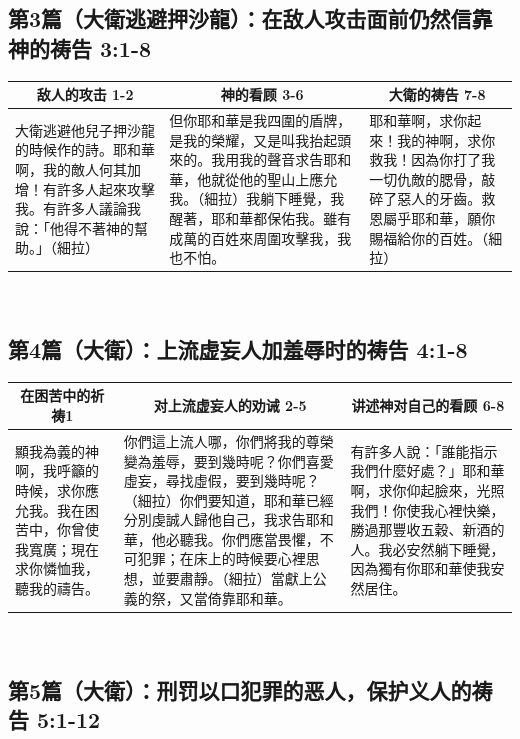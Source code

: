 \subsection{第3篇（大衛逃避押沙龍）：在敌人攻击面前仍然信靠神的祷告 3:1-8}
\begin{table}[H]
\centering
\begin{tabular}{p{}|p{6.500cm}|p{5.2500cm}}\hline\hline
\multicolumn{1}{c|}{敌人的攻击 1-2}&\multicolumn{1}{c|}{神的看顾 3-6}&\multicolumn{1}{c}{大衛的祷告 7-8}\\\hline
大衛逃避他兒子押沙龍的時候作的詩。耶和華啊，我的敵人何其加增！有許多人起來攻擊我。有許多人議論我說：「他得不著神的幫助。」（細拉）
&但你耶和華是我四圍的盾牌，是我的榮耀，又是叫我抬起頭來的。我用我的聲音求告耶和華，他就從他的聖山上應允我。（細拉）我躺下睡覺，我醒著，耶和華都保佑我。雖有成萬的百姓來周圍攻擊我，我也不怕。
&耶和華啊，求你起來！我的神啊，求你救我！因為你打了我一切仇敵的腮骨，敲碎了惡人的牙齒。救恩屬乎耶和華，願你賜福給你的百姓。（細拉）\\\hline
\end{tabular}
\end{table} 


\subsection{第4篇（大衛）：上流虚妄人加羞辱时的祷告  4:1-8}
\begin{table}[H]
\centering
\begin{tabular}{p{}|p{8.500cm}|p{5.2500cm}}\hline\hline
\multicolumn{1}{c|}{在困苦中的祈祷1}&\multicolumn{1}{c|}{对上流虚妄人的劝诫  2-5}&\multicolumn{1}{c}{讲述神对自己的看顾  6-8}\\\hline
顯我為義的神啊，我呼籲的時候，求你應允我。我在困苦中，你曾使我寬廣；現在求你憐恤我，聽我的禱告。
&你們這上流人哪，你們將我的尊榮變為羞辱，要到幾時呢？你們喜愛虛妄，尋找虛假，要到幾時呢？（細拉）你們要知道，耶和華已經分別虔誠人歸他自己，我求告耶和華，他必聽我。你們應當畏懼，不可犯罪；在床上的時候要心裡思想，並要肅靜。（細拉）當獻上公義的祭，又當倚靠耶和華。
&有許多人說：「誰能指示我們什麼好處？」耶和華啊，求你仰起臉來，光照我們！你使我心裡快樂，勝過那豐收五穀、新酒的人。我必安然躺下睡覺，因為獨有你耶和華使我安然居住。\\\hline
\end{tabular}
\end{table} 


\subsection{第5篇（大衛）：刑罚以口犯罪的恶人，保护义人的祷告  5:1-12}
